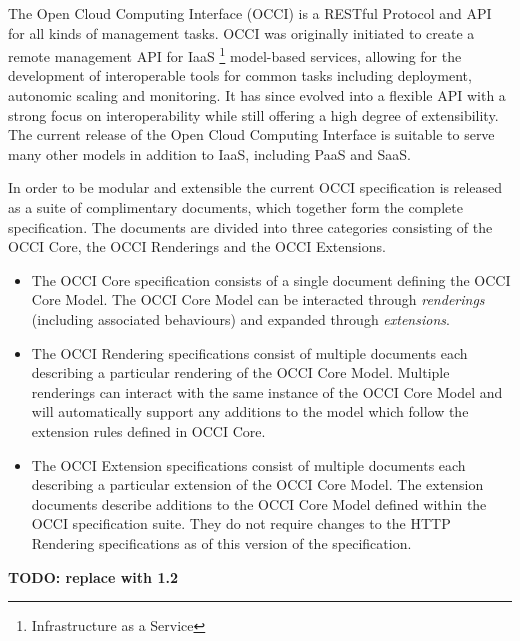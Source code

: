 The Open Cloud Computing Interface (OCCI) is a RESTful Protocol and
API for all kinds of management tasks. OCCI was originally initiated
to create a remote management API for IaaS%
\footnote{Infrastructure as a Service}
model-based services, allowing for the development of interoperable tools for
common tasks including deployment, autonomic scaling and monitoring.
%
It has since evolved into a flexible API with a strong focus on
interoperability while still offering a high degree of extensibility. The
current release of the Open Cloud Computing Interface is suitable to serve many
other models in addition to IaaS, including PaaS and SaaS.

In order to be modular and extensible the current OCCI specification is
released as a suite of complimentary documents, which together form the complete
specification.
%
The documents are divided into three categories consisting of the OCCI Core,
the OCCI Renderings and the OCCI Extensions.
%
\begin{itemize}
\item The OCCI Core specification consists of a single document defining the
 OCCI Core Model. The OCCI Core Model can be interacted through {\em
 renderings} (including associated behaviours) and expanded through {\em extensions}.
\item The OCCI Rendering specifications consist of multiple documents each
 describing a particular rendering of the OCCI Core Model. Multiple renderings can
 interact with the same instance of the OCCI Core Model and will automatically support
 any additions to the model which follow the extension rules defined in OCCI
 Core.
\item The OCCI Extension specifications consist of multiple documents each
 describing a particular extension of the OCCI Core Model. The extension documents
 describe additions to the OCCI Core Model defined within the OCCI specification
 suite. They do not require changes to the HTTP Rendering specifications as of this version of the specification.
\end{itemize}
%
{\color{red} \textbf{TODO: replace with 1.2}}

%
